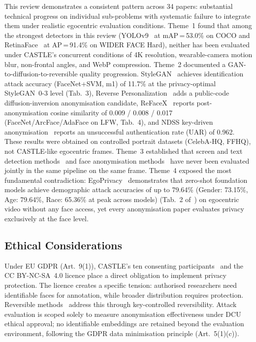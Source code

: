 \documentclass[10pt, twocolumn]{IEEEtran}
\begin{document}
This review demonstrates a consistent pattern across 34 papers: substantial technical progress on individual sub-problems with systematic failure to integrate them under realistic egocentric evaluation conditions. Theme~1 found that among the strongest detectors in this review (YOLOv9~\cite{wang2024yolov9} at mAP\,=\,53.0\% on COCO and RetinaFace~\cite{deng2020retinaface} at AP\,=\,91.4\% on WIDER FACE Hard), neither has been evaluated under CASTLE's concurrent conditions of 4K resolution, wearable-camera motion blur, non-frontal angles, and WebP compression. Theme~2 documented a GAN-to-diffusion-to-reversible quality progression. StyleGAN~\cite{khorzooghi2023gan} achieves identification attack accuracy (FaceNet+SVM, m1) of 11.7\% at the privacy-optimal StyleGAN~0-3 level (Tab.~3), Reverse Personalization~\cite{kung2026reverse} adds a public-code diffusion-inversion anonymisation candidate, ReFaceX~\cite{muhammad2026refacex} reports post-anonymisation cosine similarity of 0.009 / 0.008 / 0.017 (FaceNet/ArcFace/AdaFace on LFW, Tab.~4), and NDSS key-driven anonymisation~\cite{zhang2025keydriven} reports an unsuccessful authentication rate (UAR) of 0.962. These results were obtained on controlled portrait datasets (CelebA-HQ, FFHQ), not CASTLE-like egocentric frames. Theme~3 established that screen and text detection methods~\cite{li2026screen,liao2020dbnet,baek2019craft,li2023trocr} and face anonymisation methods~\cite{khorzooghi2023gan,meden2023cppdeidentification,hukkelas2023deepprivacy2,ilic2024selective,iravantchi2024privacylens,he2024diffprivacy,you2024difp,kung2026reverse,muhammad2026refacex,kung2025face,hellmann2024ganonymization,khan2024survey,lopez2024privacy,zhang2025keydriven,thapar2021anonymizing} have never been evaluated jointly in the same pipeline on the same frame. Theme~4 exposed the most fundamental contradiction: EgoPrivacy~\cite{li2025egoprivacy} demonstrates that zero-shot foundation models achieve demographic attack accuracies of up to 79.64\% (Gender: 73.15\%, Age: 79.64\%, Race: 65.36\% at peak across models) (Tab.~2 of~\cite{li2025egoprivacy}) on egocentric video without any face access, yet every anonymisation paper evaluates privacy exclusively at the face level.

\subsection{Ethical Considerations}

Under EU GDPR (Art.~9(1)), CASTLE's ten consenting participants~\cite{rossetto2025castle} and the CC BY-NC-SA~4.0 licence place a direct obligation to implement privacy protection. The licence creates a specific tension: authorised researchers need identifiable faces for annotation, while broader distribution requires protection. Reversible methods~\cite{muhammad2026refacex,zhang2025keydriven} address this through key-controlled reversibility. Attack evaluation is scoped solely to measure anonymisation effectiveness under DCU ethical approval; no identifiable embeddings are retained beyond the evaluation environment, following the GDPR data minimisation principle (Art.~5(1)(c)).
\end{document}
